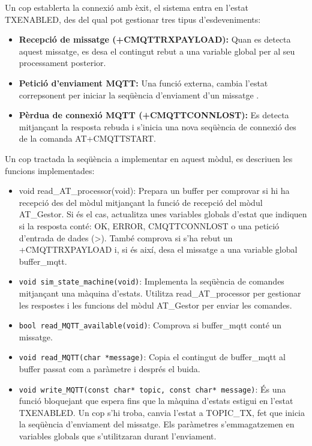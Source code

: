 \documentclass{tfgitic}[2024/07/01]
\begin{document}
Un cop establerta la connexió amb èxit, el sistema entra en l'estat TXENABLED, des del qual pot gestionar tres tipus d'esdeveniments:

\begin{itemize}
  \item \textbf{Recepció de missatge (+CMQTTRXPAYLOAD):} Quan es detecta aquest missatge, es desa el contingut rebut a una variable global per al seu 
  processament posterior.

  \item \textbf{Petició d'enviament MQTT:} Una funció externa, cambia l'estat correpsonent per iniciar la seqüència d'enviament d'un missatge .

  \item \textbf{Pèrdua de connexió MQTT (+CMQTTCONNLOST):} Es detecta mitjançant la resposta rebuda i s'inicia una nova seqüència de connexió des de 
  la comanda AT+CMQTTSTART.
\end{itemize}

Un cop tractada la seqüència a implementar en aquest mòdul, es descriuen les funcions implementades:

\begin{itemize}
  \item void read\_AT\_processor(void): Prepara un buffer per comprovar si hi ha recepció des del mòdul  mitjançant la funció de recepció 
  del mòdul AT\_Gestor. Si és el cas, actualitza unes variables globals d'estat que indiquen si la resposta conté: OK, ERROR, 
  CMQTTCONNLOST o una petició d'entrada de dades (>). També comprova si s'ha rebut un +CMQTTRXPAYLOAD i, si és així, desa el 
  missatge a una variable global buffer\_mqtt.

  \item \texttt{void sim\_state\_machine(void)}: Implementa la seqüència de comandes  mitjançant una màquina d'estats. Utilitza read\_AT\_processor 
  per gestionar les respostes i les funcions del mòdul AT\_Gestor per enviar les comandes.

  \item \texttt{bool read\_MQTT\_available(void)}: Comprova si buffer\_mqtt conté un missatge.

  \item \texttt{void read\_MQTT(char *message)}: Copia el contingut de buffer\_mqtt al buffer passat com a paràmetre i després el buida.

  \item \texttt{void write\_MQTT(const char* topic, const char* message)}: És una funció bloquejant que espera fins que la màquina d'estats estigui en 
  l'estat TXENABLED. Un cop s'hi troba, canvia l'estat a TOPIC\_TX, fet que inicia la seqüència d'enviament del missatge. Els paràmetres 
  s'emmagatzemen en variables globals que s'utilitzaran durant l'enviament.
\end{itemize}
\end{document}
